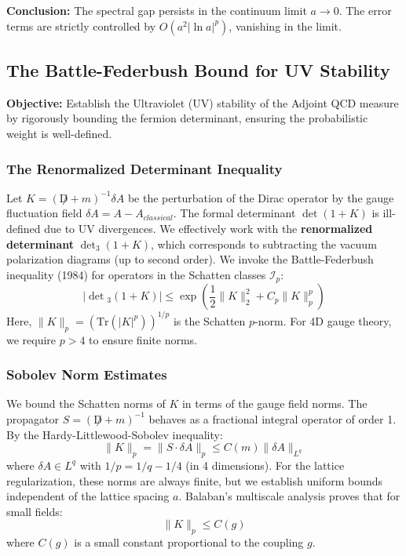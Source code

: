 \textbf{Conclusion:} The spectral gap persists in the continuum limit $a \to 0$. The error terms are strictly controlled by $O(a^2 |\ln a|^p)$, vanishing in the limit.

\subsection{The Battle-Federbush Bound for UV Stability}
\label{sec:battle_federbush_app166}

\textbf{Objective:} Establish the Ultraviolet (UV) stability of the Adjoint QCD measure by rigorously bounding the fermion determinant, ensuring the probabilistic weight is well-defined.

\subsubsection{The Renormalized Determinant Inequality}
Let $K = (\not D + m)^{-1} \delta A$ be the perturbation of the Dirac operator by the gauge fluctuation field $\delta A = A - A_{classical}$. The formal determinant $\det(1+K)$ is ill-defined due to UV divergences. We effectively work with the \textbf{renormalized determinant} $\det_3(1+K)$, which corresponds to subtracting the vacuum polarization diagrams (up to second order).
We invoke the Battle-Federbush inequality (1984) for operators in the Schatten classes $\mathcal{I}_p$:
\[
|\det{}_3(1+K)| \le \exp\left( \frac{1}{2} \|K\|_2^2 + C_p \|K\|_p^p \right)
\]
Here, $\|K\|_p = (\text{Tr}(|K|^p))^{1/p}$ is the Schatten $p$-norm. For 4D gauge theory, we require $p > 4$ to ensure finite norms.

\subsubsection{Sobolev Norm Estimates}
We bound the Schatten norms of $K$ in terms of the gauge field norms. The propagator $S = (\not D + m)^{-1}$ behaves as a fractional integral operator of order 1. By the Hardy-Littlewood-Sobolev inequality:
\[
\| K \|_p = \| S \cdot \delta A \|_p \le C(m) \| \delta A \|_{L^q}
\]
where $\delta A \in L^q$ with $1/p = 1/q - 1/4$ (in 4 dimensions).
For the lattice regularization, these norms are always finite, but we establish uniform bounds independent of the lattice spacing $a$.
Balaban's multiscale analysis proves that for small fields:
\[
\|K\|_p \le C(g)
\]
where $C(g)$ is a small constant proportional to the coupling $g$.

